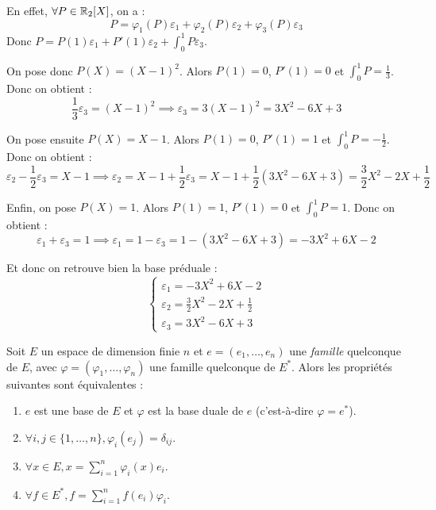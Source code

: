 \documentclass[11pt,a4paper]{report}
\begin{document}
\begin{example}
    En effet, $\forall P \in \mathbb{R}_2[X]$, on a :
    $$P = \varphi_1(P) \varepsilon_1 + \varphi_2(P) \varepsilon_2 + \varphi_3(P) \varepsilon_3$$
    Donc $P = P(1) \varepsilon_1 + P'(1) \varepsilon_2 + \int_0^1 P \varepsilon_3$.
    
    On pose donc $P(X) = (X-1)^2$. Alors $P(1) = 0$, $P'(1) = 0$ et $\int_0^1 P = \frac{1}{3}$. Donc on obtient :
    $$\frac{1}{3} \varepsilon_3 = (X-1)^2 \implies \varepsilon_3 = 3(X-1)^2 = 3X^2 - 6X + 3$$

    On pose ensuite $P(X) = X-1$. Alors $P(1) = 0$, $P'(1) = 1$ et $\int_0^1 P = -\frac{1}{2}$. Donc on obtient :
    $$\varepsilon_2 - \frac{1}{2} \varepsilon_3 = X-1 \implies \varepsilon_2 = X-1 + \frac{1}{2} \varepsilon_3 = X-1 + \frac{1}{2}(3X^2 - 6X + 3) = \frac{3}{2}X^2 - 2X + \frac{1}{2}$$

    Enfin, on pose $P(X) = 1$. Alors $P(1) = 1$, $P'(1) = 0$ et $\int_0^1 P = 1$. Donc on obtient :
    $$\varepsilon_1 + \varepsilon_3 = 1 \implies \varepsilon_1 = 1 - \varepsilon_3 = 1 - (3X^2 - 6X + 3) = -3X^2 + 6X - 2$$

    Et donc on retrouve bien la base préduale :
    $$\begin{cases}
        \varepsilon_1 = -3X^2 + 6X - 2 \\
        \varepsilon_2 = \frac{3}{2}X^2 - 2X + \frac{1}{2} \\
        \varepsilon_3 = 3X^2 - 6X + 3
    \end{cases}$$
\end{example}

\begin{proposition}
    \label{prop:equivalence_base_duale}
    Soit $E$ un espace de dimension finie $n$ et $e = (e_1,\dots,e_n)$ une \textit{famille} quelconque de $E$, avec $\varphi = (\varphi_1,\dots,\varphi_n)$ une famille quelconque de $E^*$. Alors les propriétés suivantes sont équivalentes :
    \begin{enumerate}
        \item $e$ est une base de $E$ et $\varphi$ est la base duale de $e$ (c'est-à-dire $\varphi = e^*$).
        \item $\forall i,j \in \{1,\dots,n\}, \varphi_i(e_j) = \delta_{ij}$.
        \item $\forall x \in E, x= \sum_{i=1}^n \varphi_i(x) e_i$.
        \item $\forall f \in E^*, f = \sum_{i=1}^n f(e_i) \varphi_i$.
    \end{enumerate}
\end{proposition}
\end{document}

